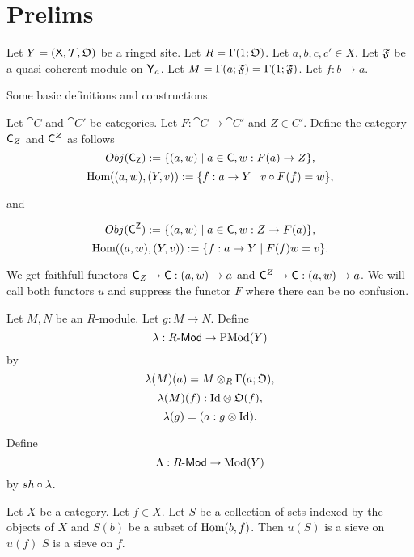



\section*{Prelims}

Let $Y = ({\mathsf{X}}, {\mathcal{T}}, {\mathfrak{O}})$ be a ringed site.
Let $R = \globalsections{O}$. Let $a,b,c,c'\in X$.
Let $\mathfrak{F}$ be a quasi-coherent module on ${\mathsf{Y}}_{a}$.
Let $M = \sections{a}{F} = \globalsections{F}$.
Let $f:b \rightarrow a$.

Some basic definitions and constructions.

\begin{definition}
Let $\cat{C}$ and $\cat{C'}$ be categories. Let $F:\cat{C}\rightarrow \cat{C'}$ and $Z\in C'$. 
Define the category ${\mathsf{C}}_{Z}$ and ${\mathsf{C}}^{Z}$ as follows
\[Obj({\mathsf{{\mathsf{C}}_{Z}}}) := \{(a,w) \mid a\in {\ensuremath{\mathsf{C}}}, w:F(a)\rightarrow Z\},\]
\[\mbox{Hom}((a,w),(Y,v)) := \{f:a\rightarrow Y \mid v\circ F(f) = w  \},\]

and

\[Obj({\mathsf{{\mathsf{C}}^{Z}}}) := \{(a,w) \mid a\in {\ensuremath{\mathsf{C}}}, w:Z\rightarrow F(a)\},\]
\[\mbox{Hom}((a,w),(Y,v)) := \{f:a\rightarrow Y \mid F(f)w = v  \}.\]

We get faithfull functors 
${\mathsf{C}}_{Z} \rightarrow {\ensuremath{\mathsf{C}}}: (a,w)\rightarrow a$ and 
${\mathsf{C}}^{Z} \rightarrow {\ensuremath{\mathsf{C}}}: (a,w)\rightarrow a$.
We will call both functors $u$ and suppress the functor $F$ where there can be no confusion.
\end{definition}


\begin{definition}
Let $M,N$ be an $R$-module.
Let $g:M \rightarrow N$.
Define 
\[\pstilde: \modules{R} \rightarrow \pshmodules{Y}\]
by
\[\pstilde(M)(a) = M \tensor_R \sections{a}{O} ,\]
\[\pstilde(M)(f): \id \tensor \sheaf{O}(f) ,\]
\[\pstilde(g) = (a: g \tensor \id ).\]
\end{definition}

\begin{definition}
Define
\[\stilde: \modules{R} \rightarrow \shmodules{Y}\]
by
$\sheafify \circ \pstilde$.
\end{definition}



\begin{lemma}
Let $X$ be a category.
Let $f\in X$.
Let $S$ be a collection of sets indexed by the objects of $X$
and $S(b)$ be a subset of $\mbox{Hom}(b,f)$.
Then $u(S)$ is a sieve on $u(f)$ \iff $S$ is a sieve on $f$.
\end{lemma}

